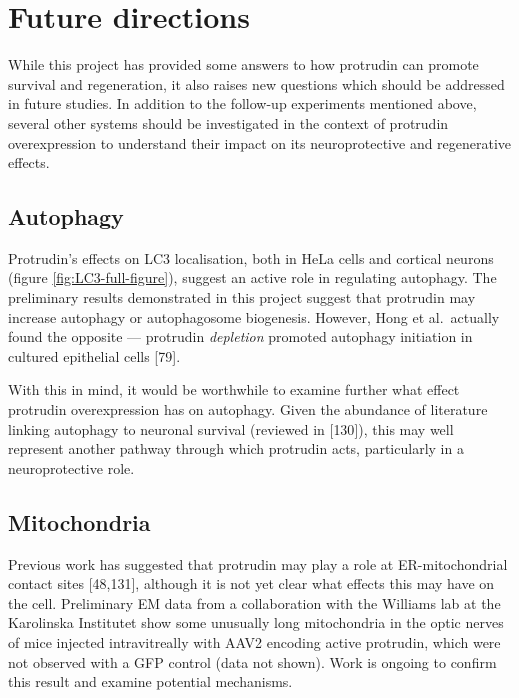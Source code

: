 \documentclass[
  12pt,
  a4paper,
]{book}
\begin{document}
\hypertarget{future-directions}{%
\section{Future directions}\label{future-directions}}

While this project has provided some answers to how protrudin can promote survival and regeneration, it also raises new questions which should be addressed in future studies. In addition to the follow-up experiments mentioned above, several other systems should be investigated in the context of protrudin overexpression to understand their impact on its neuroprotective and regenerative effects.

\hypertarget{autophagy}{%
\subsection{Autophagy}\label{autophagy}}

Protrudin's effects on LC3 localisation, both in HeLa cells and cortical neurons (figure \ref{fig:LC3-full-figure}), suggest an active role in regulating autophagy. The preliminary results demonstrated in this project suggest that protrudin may increase autophagy or autophagosome biogenesis. However, Hong et al.~actually found the opposite --- protrudin \emph{depletion} promoted autophagy initiation in cultured epithelial cells {[}79{]}.

With this in mind, it would be worthwhile to examine further what effect protrudin overexpression has on autophagy. Given the abundance of literature linking autophagy to neuronal survival (reviewed in {[}130{]}), this may well represent another pathway through which protrudin acts, particularly in a neuroprotective role.

\hypertarget{mitochondria-1}{%
\subsection{Mitochondria}\label{mitochondria-1}}

Previous work has suggested that protrudin may play a role at ER-mitochondrial contact sites {[}48,131{]}, although it is not yet clear what effects this may have on the cell. Preliminary EM data from a collaboration with the Williams lab at the Karolinska Institutet show some unusually long mitochondria in the optic nerves of mice injected intravitreally with AAV2 encoding active protrudin, which were not observed with a GFP control (data not shown). Work is ongoing to confirm this result and examine potential mechanisms.
\end{document}
